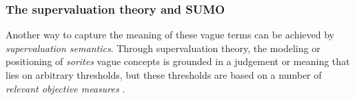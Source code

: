 \documentclass[11pt]{article}
\begin{document}
\subsubsection{The supervaluation theory and SUMO}
%


Another way to capture the meaning of these vague terms can be achieved by \textit{supervaluation semantics}. 
Through supervaluation theory, the modeling or positioning of \emph{sorites} vague concepts is grounded in a 
judgement or meaning that lies on arbitrary thresholds, but these thresholds are based on a number of \textit{relevant objective measures} \cite{Bennett06kr}. 
 
\end{document}
